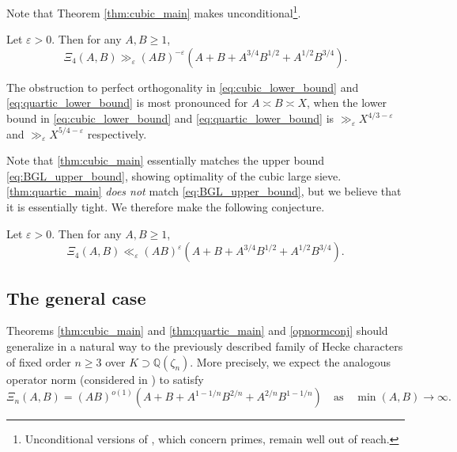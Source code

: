 \documentclass[12pt,reqno]{amsart}
\numberwithin{equation}{section}
\newcommand{\Q}{\mathbb{Q}}
\begin{document}
Note that Theorem \ref{thm:cubic_main} makes \cite[Theorem~1.4]{DR} unconditional\footnote{Unconditional versions of \cite[Theorems~1.1--1.3]{DR}, which concern primes, remain well out of reach.}.

\begin{theorem} \label{thm:quartic_main}
     Let $\varepsilon > 0$. Then for any $A, B \geq 1$,
    \begin{equation} \label{eq:quartic_lower_bound}
        \Xi_4(A,B)  \gg_\varepsilon (AB)^{-\varepsilon} (A + B + A^{3/4} B^{1/2} + A^{1/2} B^{3/4}).
    \end{equation}
\end{theorem}

The obstruction to perfect orthogonality in \eqref{eq:cubic_lower_bound} and \eqref{eq:quartic_lower_bound} is most pronounced for $A \asymp B \asymp X$, when the lower bound in \eqref{eq:cubic_lower_bound} and \eqref{eq:quartic_lower_bound} is $\gg_\varepsilon X^{4/3-\varepsilon}$ and $\gg_\varepsilon X^{5/4-\varepsilon}$ respectively. 

Note that \cref{thm:cubic_main} essentially matches the upper bound \eqref{eq:BGL_upper_bound}, showing optimality of the cubic large sieve. \cref{thm:quartic_main} \emph{does not} match \eqref{eq:BGL_upper_bound}, but we believe that it is essentially tight. We therefore make the following conjecture.

\begin{conjecture} \label{opnormconj}
     Let $\varepsilon > 0$. Then for any $A, B \geq 1$,
    \begin{equation} \label{Xistep}
        \Xi_4(A,B) \ll_{\varepsilon} (AB)^{\varepsilon}(A + B + A^{3/4} B^{1/2} + A^{1/2} B^{3/4}).
    \end{equation}
\end{conjecture}

\subsection{The general case}
 
Theorems \ref{thm:cubic_main} and \ref{thm:quartic_main} and \cref{opnormconj} should generalize in a
natural way to the previously described family of Hecke characters of fixed order $n \geq 3$ over $K \supset \Q(\zeta_n)$. More precisely, we expect the analogous operator norm (considered in \cite[Theorem~1.3]{BGL}) to satisfy
\begin{equation}\label{eq:general_n_conjecture}
    \Xi_n(A,B) = (AB)^{o(1)}(A+B+A^{1-1/n} B^{2/n}+A^{2/n} B^{1-1/n}) \quad  \text{as} \quad \min(A, B) \to \infty.
\end{equation}
\end{document}
